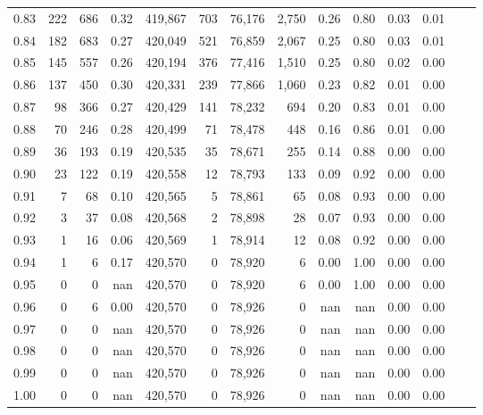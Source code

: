 \begin{tabular}{rrrrrrrrrrrrrr}
0.83 &     222 &    686 &    0.32 &  419,867 &      703 &  76,176 &   2,750 &  0.26 &  0.80 &  0.03 &      0.01 \\
0.84 &     182 &    683 &    0.27 &  420,049 &      521 &  76,859 &   2,067 &  0.25 &  0.80 &  0.03 &      0.01 \\
0.85 &     145 &    557 &    0.26 &  420,194 &      376 &  77,416 &   1,510 &  0.25 &  0.80 &  0.02 &      0.00 \\
0.86 &     137 &    450 &    0.30 &  420,331 &      239 &  77,866 &   1,060 &  0.23 &  0.82 &  0.01 &      0.00 \\
0.87 &      98 &    366 &    0.27 &  420,429 &      141 &  78,232 &     694 &  0.20 &  0.83 &  0.01 &      0.00 \\
0.88 &      70 &    246 &    0.28 &  420,499 &       71 &  78,478 &     448 &  0.16 &  0.86 &  0.01 &      0.00 \\
0.89 &      36 &    193 &    0.19 &  420,535 &       35 &  78,671 &     255 &  0.14 &  0.88 &  0.00 &      0.00 \\
0.90 &      23 &    122 &    0.19 &  420,558 &       12 &  78,793 &     133 &  0.09 &  0.92 &  0.00 &      0.00 \\
0.91 &       7 &     68 &    0.10 &  420,565 &        5 &  78,861 &      65 &  0.08 &  0.93 &  0.00 &      0.00 \\
0.92 &       3 &     37 &    0.08 &  420,568 &        2 &  78,898 &      28 &  0.07 &  0.93 &  0.00 &      0.00 \\
0.93 &       1 &     16 &    0.06 &  420,569 &        1 &  78,914 &      12 &  0.08 &  0.92 &  0.00 &      0.00 \\
0.94 &       1 &      6 &    0.17 &  420,570 &        0 &  78,920 &       6 &  0.00 &  1.00 &  0.00 &      0.00 \\
0.95 &       0 &      0 &     nan &  420,570 &        0 &  78,920 &       6 &  0.00 &  1.00 &  0.00 &      0.00 \\
0.96 &       0 &      6 &    0.00 &  420,570 &        0 &  78,926 &       0 &   nan &   nan &  0.00 &      0.00 \\
0.97 &       0 &      0 &     nan &  420,570 &        0 &  78,926 &       0 &   nan &   nan &  0.00 &      0.00 \\
0.98 &       0 &      0 &     nan &  420,570 &        0 &  78,926 &       0 &   nan &   nan &  0.00 &      0.00 \\
0.99 &       0 &      0 &     nan &  420,570 &        0 &  78,926 &       0 &   nan &   nan &  0.00 &      0.00 \\
1.00 &       0 &      0 &     nan &  420,570 &        0 &  78,926 &       0 &   nan &   nan &  0.00 &      0.00 \\
\bottomrule
\end{tabular}
